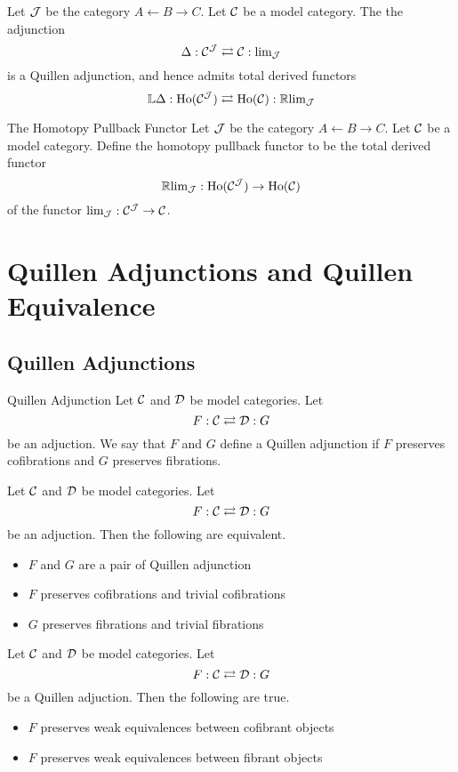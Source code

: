 \documentclass[a4paper]{article}
\begin{document}
\begin{thm}{}{} Let $\mathcal{J}$ be the category $A\leftarrow B\rightarrow C$. Let $\mathcal{C}$ be a model category. The the adjunction $$\Delta:\mathcal{C}^{\mathcal{J}}\rightleftarrows\mathcal{C}:\text{lim}_{\mathcal{J}}$$ is a Quillen adjunction, and hence admits total derived functors $$\mathbb{L}\Delta:\text{Ho}(\mathcal{C}^{\mathcal{J}})\rightleftarrows\text{Ho}(\mathcal{C}):\mathbb{R}\text{lim}_{\mathcal{J}}$$
\end{thm}

\begin{defn}{The Homotopy Pullback Functor}{} Let $\mathcal{J}$ be the category $A\leftarrow B\rightarrow C$. Let $\mathcal{C}$ be a model category. Define the homotopy pullback functor to be the total derived functor $$\mathbb{R}\text{lim}_{\mathcal{J}}:\text{Ho}(\mathcal{C}^{\mathcal{J}})\to\text{Ho}(\mathcal{C})$$ of the functor $\text{lim}_{\mathcal{J}}:\mathcal{C}^{\mathcal{J}}\to\mathcal{C}$. 
\end{defn}

\pagebreak
\section{Quillen Adjunctions and Quillen Equivalence}
\subsection{Quillen Adjunctions}
\begin{defn}{Quillen Adjunction}{} Let $\mathcal{C}$ and $\mathcal{D}$ be model categories. Let $$F:\mathcal{C}\rightleftarrows\mathcal{D}:G$$ be an adjuction. We say that $F$ and $G$ define a Quillen adjunction if $F$ preserves cofibrations and $G$ preserves fibrations. 
\end{defn}

\begin{thm}{}{} Let $\mathcal{C}$ and $\mathcal{D}$ be model categories. Let $$F:\mathcal{C}\rightleftarrows\mathcal{D}:G$$ be an adjuction. Then the following are equivalent. 
\begin{itemize}
\item $F$ and $G$ are a pair of Quillen adjunction
\item $F$ preserves cofibrations and trivial cofibrations
\item $G$ preserves fibrations and trivial fibrations
\end{itemize}
\end{thm}

\begin{prp}{}{} Let $\mathcal{C}$ and $\mathcal{D}$ be model categories. Let $$F:\mathcal{C}\rightleftarrows\mathcal{D}:G$$ be a Quillen adjuction. Then the following are true. 
\begin{itemize}
\item $F$ preserves weak equivalences between cofibrant objects
\item $F$ preserves weak equivalences between fibrant objects
\end{itemize}
\end{prp}
\end{document}

